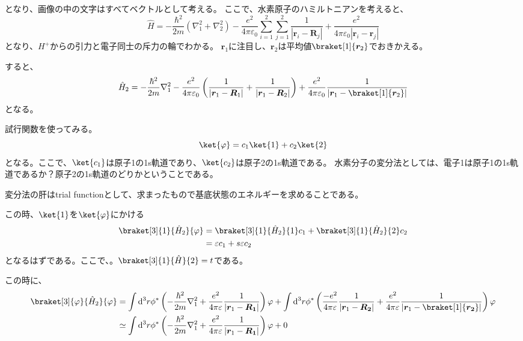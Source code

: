 \documentclass[titlepage]{ltjsarticle}
\newcommand{\mel}[3]{\braket[3]{#1}{#2}{#3}}
\newcommand{\ev}[1]{\braket[1]{#1}}
\begin{document}
となり、画像の中の文字はすべてベクトルとして考える。
ここで、水素原子のハミルトニアンを考えると、
\begin{equation}
  \hat{H} = -\frac{\hbar^2}{2m} (\nabla_1^2 + \nabla_2^2) - \frac{e^2}{4\pi \varepsilon_0 } \sum^2_{i=1} \sum^2_{j=1} \frac{1}{|\bm{r}_i-\bm{R}_j|} +  \frac{e^2}{4\pi \varepsilon_0 |\bm{r}_i-\bm{r}_j|}
\end{equation}
となり、\(H^+\)からの引力と電子同士の斥力の輪でわかる。
\(\bm{r}_1\)に注目し、\(\bm{r}_2\)は平均値\(\ev{\bm{r}_2}\)でおきかえる。

すると、
\begin{equation}
  \hat{H}_2 = -\frac{\hbar^2}{2m} \nabla_1^2 -\frac{e^2}{4\pi \varepsilon_0} \left( 
    \frac{1}{|\bm{r}_1-\bm{R}_1|} + \frac{1}{|\bm{r}_1-\bm{R}_2|} 
   \right) 
   + \frac{e^2}{4\pi \varepsilon_0} \frac{1}{|\bm{r}_1-\ev{\bm{r}_2}|}
\end{equation}
となる。

試行関数を使ってみる。
\begin{equation}
  \ket{\varphi} = c_1 \ket{1} + c_2 \ket{2}
\end{equation}
となる。ここで、\(\ket{c_1}\)は原子1の1s軌道であり、\(\ket{c_2}\)は原子2の1s軌道である。
水素分子の変分法としては、電子1は原子1の1s軌道であるか？原子2の1s軌道のどりかということである。


変分法の肝はtrial functionとして、求まったもので基底状態のエネルギーを求めることである。

この時、\(\ket{1}\)を\(\ket{\varphi}\)にかける
\begin{align}
  \mel{1}{\hat{H}_2}{\varphi}  & = \mel{1}{\hat{H}_2}{1}c_1 + \mel{1}{\hat{H}_2}{2}c_2\\
  & = \varepsilon c_1 + s\varepsilon c_2
\end{align}
となるはずである。ここで、。\(\mel{1}{\hat{H}}{2}=t\)である。


この時に、
\begin{align}
  \mel{\varphi}{\hat{H}_2}{\varphi} & = \int \odif[order=3]{r} \phi^\ast \left( -\frac{\hbar^2}{2m}\nabla^2_1 + \frac{e^2}{4\pi \varepsilon}\frac{1}{|\bm{r}_1-\bm{R_1}|} \right) \varphi + 
  \int \odif[order=3]{r} \phi^\ast \left( \frac{-e^2}{4\pi \varepsilon}\frac{1}{|\bm{r}_1-\bm{R_2}|}+ \frac{e^2}{4\pi \varepsilon}\frac{1}{|\bm{r}_1-\ev{\bm{r_2}}|} \right) \varphi \\
  & \simeq  \int \odif[order=3]{r} \phi^\ast \left( -\frac{\hbar^2}{2m}\nabla^2_1 + \frac{e^2}{4\pi \varepsilon}\frac{1}{|\bm{r}_1-\bm{R_1}|} \right) \varphi + 0
\end{align}
\end{document}
